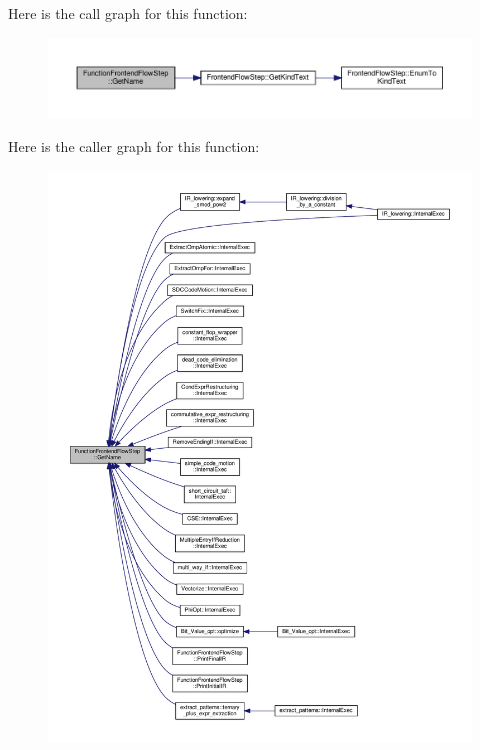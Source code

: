 Here is the call graph for this function\+:
\nopagebreak
\begin{figure}[H]
\begin{center}
\leavevmode
\includegraphics[width=350pt]{d8/d0a/classFunctionFrontendFlowStep_add9013c4bc46fe7e932151ca5b902d32_cgraph}
\end{center}
\end{figure}
Here is the caller graph for this function\+:
\nopagebreak
\begin{figure}[H]
\begin{center}
\leavevmode
\includegraphics[width=350pt]{d8/d0a/classFunctionFrontendFlowStep_add9013c4bc46fe7e932151ca5b902d32_icgraph}
\end{center}
\end{figure}
\mbox{\label{classFunctionFrontendFlowStep_a89e3f6d142de8aacb36eeb7b3f3d5ad8}} 
